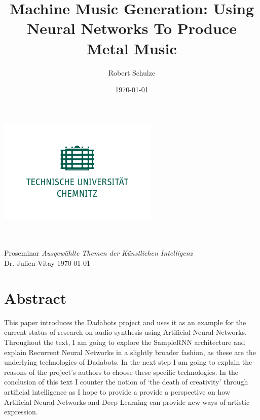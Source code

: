 \documentclass[a4paper, 11pt]{report}
\author{Robert Schulze}
\title{Machine Music Generation: Using Neural Networks To Produce Metal Music}
\date{\today}
\begin{document}
\begin{titlepage}
    \begin{center}
        \includegraphics[height=5cm]{tuc-gruen.png}
        
        \begin{Large}
            \textbf{\thetitle} \\
            \theauthor \\
            Proseminar \textit{Ausgewählte Themen der Künstlichen Intelligenz} \\
            Dr. Julien Vitay
            \today 
            
        \end{Large}
        
    \end{center}
\end{titlepage}

\renewcommand{\thechapter}{\Roman{chapter}}

\setcounter{page}{1} 

\tableofcontents

\chapter*{Abstract}
This paper introduces the Dadabots project and uses it as an example for the 
current status of research on audio synthesis using Artificial Neural 
Networks. Throughout the text, I am going to explore the SampleRNN architecture 
and explain Recurrent Neural Networks in a slightly broader fashion, as these 
are the underlying technologies of Dadabots. In the next step I am going to 
explain the reasons of the project’s authors to choose these specific 
technologies. In the conclusion of this text I counter the notion of ‘the death 
of creativity’ through artificial intelligence as I hope to provide a provide 
a perspective on how Artificial Neural Networks and Deep Learning can 
provide new ways of artistic expression.
\end{document}
